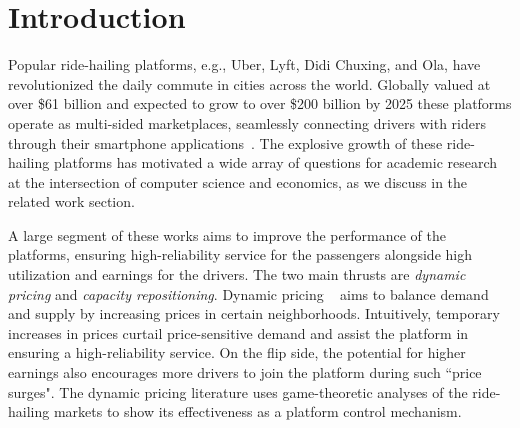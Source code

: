 \section{Introduction}
\label{sec:introduction}

Popular ride-hailing platforms, e.g., Uber, Lyft, Didi Chuxing, and Ola, have
    revolutionized the daily commute in cities across the world.
Globally valued at over \$61 billion and expected to grow to over \$200 billion by 2025
    these platforms operate as multi-sided marketplaces, seamlessly connecting drivers
    with riders through their smartphone applications~\cite{noauthor_undated-gj}.
The explosive growth of these ride-hailing platforms has motivated a wide array of 
    questions for academic research at the intersection of computer science 
    and economics, as we discuss in the related work section.

A large segment of these works aims to improve the performance of the platforms, 
    ensuring high-reliability service for the passengers alongside high utilization 
    and earnings for the drivers. 
The two main thrusts are \emph{dynamic pricing} and \emph{capacity repositioning}. 
Dynamic pricing
    ~\cite{Yan2018-wq, Besbes2019-ds, Banerjee2015-jx, Castillo2018-he, Garg2019-vs} 
    aims to balance demand and supply by increasing prices in certain
    neighborhoods. 
Intuitively, temporary increases in prices curtail price-sensitive demand and assist the 
    platform in ensuring a high-reliability service.
On the flip side, the potential for higher earnings also encourages more drivers 
    to join the platform during such ``price surges". 
The dynamic pricing literature uses  game-theoretic analyses of the 
    ride-hailing markets to show its 
    effectiveness as a platform control mechanism. 

